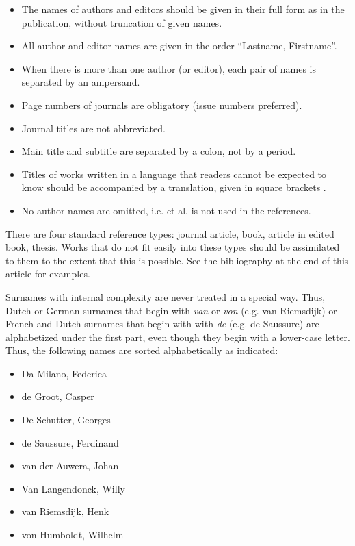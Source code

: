 \documentclass[charis,linguex,biblatex]{glossa}
\begin{document}
\begin{itemize}
\item The names of authors and editors should be given in their full form as in the publication, without truncation of given names.
\item All author and editor names are given in the order ``Lastname, Firstname''.
\item When there is more than one author (or editor), each pair of names is separated by an ampersand.
\item Page numbers of journals are obligatory (issue numbers preferred).
\item Journal titles are not abbreviated.
\item Main title and subtitle are separated by a colon, not by a period.
\item Titles of works written in a language that readers cannot be expected to know should be accompanied by a translation, given in square brackets \citep{Li1999}.
\item No author names are omitted, i.e. et al. is not used in the references.
\end{itemize}

There are four standard reference types: journal article, book, article in edited book, thesis. Works that do not fit easily into these types should be assimilated to them to the extent that this is possible. See the bibliography at the end of this article for examples.

Surnames with internal complexity are never treated in a special way. Thus, Dutch or German surnames that begin with \textit{van} or \textit{von} (e.g. van Riemsdijk) or French and Dutch surnames that begin with with \textit{de} (e.g. de Saussure) are alphabetized under the first part, even though they begin with a lower-case letter. Thus, the following names are sorted alphabetically as indicated:

\begin{itemize}
\item Da Milano, Federica
\item de Groot, Casper
\item De Schutter, Georges
\item de Saussure, Ferdinand
\item van der Auwera, Johan
\item Van Langendonck, Willy
\item van Riemsdijk, Henk
\item von Humboldt, Wilhelm
\end{itemize}
\end{document}
